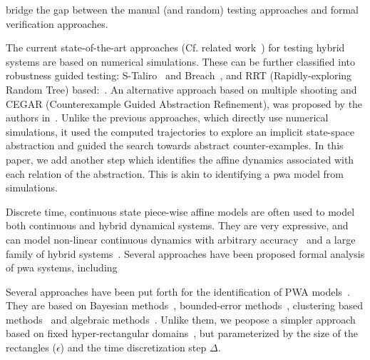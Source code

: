  bridge
the gap between the manual (and random) testing approaches and
formal verification approaches.

The current state-of-the-art approaches (Cf. related
work~\cite{nghiem2010monte}) for testing hybrid systems are based on
numerical simulations. These can be further classified into robustness
guided testing: S-Taliro~\cite{annpureddy2011s} and
Breach~\cite{donze2010breach}, and RRT (Rapidly-exploring Random Tree)
based:~\cite{nahhal_test_2007,Dang09,dreossi2015efficient}. An
alternative approach based on multiple shooting and CEGAR
(Counterexample Guided Abstraction Refinement), was proposed by the
authors in~\cite{zutshi2014multiple}. Unlike the previous approaches,
which directly use numerical simulations, it used the computed
trajectories to explore an implicit state-space abstraction and guided the
search towards abstract counter-examples. In this paper, we add
another step which identifies the affine dynamics associated with each
relation of the abstraction. This is akin to identifying a pwa model
from simulations.

 Discrete time, continuous
state piece-wise affine models are often used to model both continuous
and hybrid dynamical systems. They are very expressive, and can model
non-linear continuous dynamics with arbitrary
accuracy~\cite{wen2008basis} and a large family of hybrid
systems~\cite{heemels2001equivalence}. Several approaches have been
proposed formal analysis of pwa systems,
including~\cite{batt2007model, yordanov2007model, yordanov2010formal,
koutsoukos2003safety, asarin2000approximate}

 Several approaches have been put
forth for the identification of PWA models~\cite{paoletti2007identification}.
They are based on Bayesian methods~\cite{juloski2005bayesian}, bounded-error
methods~\cite{bemporad2003greedy,bemporad2005bounded,roll2004identification},
clustering based methods~\cite{ferrari2003clustering} and algebraic
methods~\cite{vidal2003algebraic}. Unlike them, we peopose a simpler approach
based on fixed hyper-rectangular domains~\cite{billings1987piecewise}, but
parameterized by the size of the rectangles ($\epsilon$) and the time
discretization step $\Delta$.







